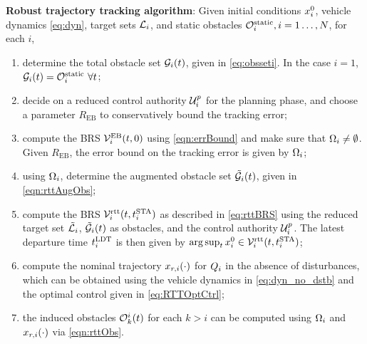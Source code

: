 \begin{alg}
\label{alg:rtt}
\textbf{Robust trajectory tracking algorithm}: Given initial conditions $x_i^0$, vehicle dynamics \eqref{eq:dyn}, target sets $\mathcal{L}_i$, and static obstacles $\mathcal{O}^\text{static}_i, i = 1\ldots, N$, for each $i$,
\begin{enumerate}
\item determine the total obstacle set $\mathcal{G}_i(t)$, given in \eqref{eq:obsseti}. In the case $i=1$, $\mathcal{G}_i(t) = \mathcal{O}^\text{static}_i ~ \forall t$;
\item decide on a reduced control authority $\mathcal{U}^p_i$ for the planning phase, and choose a parameter $R_{\text{EB}}$ to conservatively bound the tracking error;
\item compute the BRS $\mathcal{V}^{\text{EB}}_{i}(t, 0)$ using \eqref{eqn:errBound} and make sure that $\Omega_i \neq \emptyset$. Given $R_{\text{EB}}$, the error bound on the tracking error is given by $\Omega_i$;
\item using $\Omega_i$, determine the augmented obstacle set $\tilde{\mathcal{G}}_i(t)$, given in \eqref{eqn:rttAugObs};
\item compute the BRS $\mathcal{V}_i^\text{rtt}(t, t^\text{STA}_i)$ as described in \eqref{eq:rttBRS} using the reduced target set $\tilde{\mathcal{L}}_i$, $\tilde{\mathcal{G}}_i(t)$ as obstacles, and the control authority $\mathcal{U}^p_i$. The latest departure time $t^\text{LDT}_i$ is then given by $\arg \sup_t x^0_i \in \mathcal{V}_i^\text{rtt}(t, t^\text{STA}_i)$;
\item compute the nominal trajectory $x_{r,i}(\cdot)$ for $Q_i$ in the absence of disturbances, which can be obtained using the vehicle dynamics in \eqref{eq:dyn_no_dstb} and the optimal control given in \eqref{eq:RTTOptCtrl};
\item the induced obstacles $\mathcal{O}_k^i(t)$ for each $k>i$ can be computed using $\Omega_i$ and $x_{r,i}(\cdot)$ via \eqref{eqn:rttObs}.
\end{enumerate}
\end{alg}


